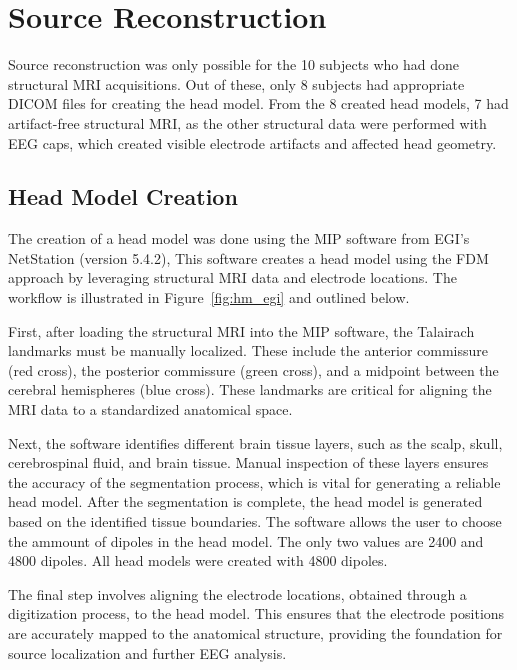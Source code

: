 \section{Source Reconstruction}
\label{section:esi}

Source reconstruction was only possible for the 10 subjects who had done structural MRI acquisitions. Out of these, only 8 subjects had appropriate DICOM files for creating the head model. From the 8 created head models, 7 had artifact-free structural MRI, as the other structural data were performed with EEG caps, which created visible electrode artifacts and affected head geometry.

\subsection{Head Model Creation}
\label{section:head_model}

The creation of a head model was done using the MIP software from EGI's NetStation (version 5.4.2), This software creates a head model using the FDM approach by leveraging structural MRI data and electrode locations. The workflow is illustrated in Figure~\ref{fig:hm_egi} and outlined below.

First, after loading the structural MRI into the MIP software, the Talairach landmarks must be manually localized. These include the anterior commissure (red cross), the posterior commissure (green cross), and a midpoint between the cerebral hemispheres (blue cross). These landmarks are critical for aligning the MRI data to a standardized anatomical space. 

Next, the software identifies different brain tissue layers, such as the scalp, skull, cerebrospinal fluid, and brain tissue. Manual inspection of these layers ensures the accuracy of the segmentation process, which is vital for generating a reliable head model. After the segmentation is complete, the head model is generated based on the identified tissue boundaries. The software allows the user to choose the ammount of dipoles in the head model. The only two values are 2400 and 4800 dipoles. All head models were created with 4800 dipoles.

The final step involves aligning the electrode locations, obtained through a digitization process, to the head model. This ensures that the electrode positions are accurately mapped to the anatomical structure, providing the foundation for source localization and further EEG analysis.

